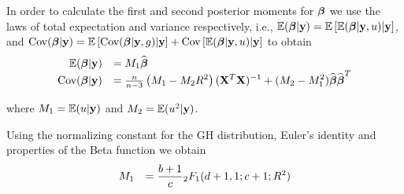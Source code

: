 \documentclass{article}[12pt]
\newcommand{\joc}[1]{{\color{red}#1}}
\begin{document}
In order to calculate the first and second posterior moments for ${\boldsymbol \beta}$
we use the laws of total expectation and variance respectively, i.e.,
${\mathbb E}({\boldsymbol \beta}|{\bf y}) = {\mathbb E}\left[ {\mathbb E}({\boldsymbol \beta}|{\bf y},u) |{\bf y} \right]$, and
$\mbox{Cov}({\boldsymbol \beta}|{\bf y})  = {\mathbb E}\left[
\mbox{Cov}({\boldsymbol \beta}|{\bf y},g)|{\bf y}
\right] + \mbox{Cov}\left[
{\mathbb E}({\boldsymbol \beta}|{\bf y},u)|{\bf y}
\right]$ 
to obtain
$$
\begin{array}{rll}
\ds \bE(\vbeta|\vy) 
& \ds = M_1 \widehat{\vbeta}
\\ %
\ds \mbox{Cov}(\vbeta|\vy) 
& \ds = \tfrac{n}{n - 3} 
\left( M_1 - M_2 R^2\right) (\mX^T\mX)^{-1}
+ (M_2 - M_1^2) \widehat{\vbeta}  \widehat{\vbeta}^T
\end{array}
$$

\noindent where
$M_1 
= {\mathbb E}(u|{\bf y})$
and
$M_2 
= {\mathbb E}(u^2|{\bf y})$.


Using the normalizing constant for the GH distribution,
Euler's identity and properties of the Beta function we obtain
\begin{equation}\label{eq:M1}
\begin{array}{rl}
\displaystyle M_1 
& \displaystyle  =    
\frac{b + 1}{c}
{}_2 F_1 (d + 1, 1; c + 1; R^2)    
\end{array} 
\end{equation}
\end{document}

